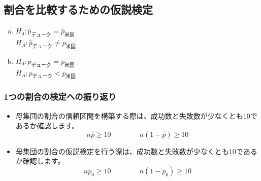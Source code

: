 
\subsection{割合を比較するための仮説検定}


\begin{frame}


\begin{enumerate}[(a)]
\item $H_0:  \hat{p}_{デューク} = \hat{p}_{米国}$ \\
$H_A:  \hat{p}_{デューク} \ne \hat{p}_{米国}$
\item $H_0:  p_{デューク} = p_{米国}$ \\
$H_A:  p_{デューク} < p_{米国}$
\end{enumerate}


\end{frame}


\begin{frame}
\frametitle{1つの割合の検定への振り返り}

\begin{itemize}

\item 母集団の割合の信頼区間を構築する際は、成功数と失敗数が少なくとも10であるか確認します。
\[ n\hat{p} \ge 10 \qquad \qquad n(1-\hat{p}) \ge 10 \]

\item 母集団の割合の仮説検定を行う際は、成功数と失敗数が少なくとも10であるか確認します。
\[ np_0 \ge 10 \qquad \qquad n(1-p_0) \ge 10 \]

\end{itemize}

\end{frame}


